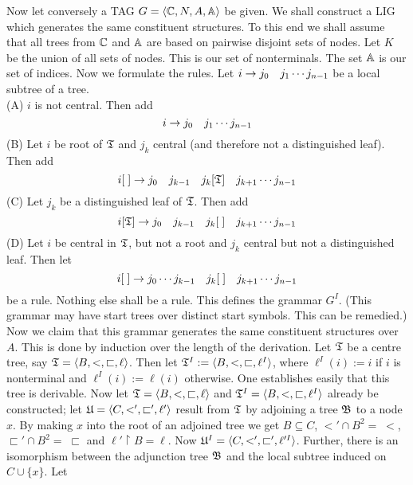 Now let conversely a TAG $G = \langle\mathbb{C}, N, A, \mathbb{A}\rangle$ be given. 
We shall construct a LIG which generates the same
constituent structures. To this end we shall assume that all
trees from $\mathbb{C}$ and $\mathbb{A}$ are based on pairwise disjoint
sets of nodes. Let $K$ be the union of all sets of nodes. This is
our set of nonterminals. The set $\mathbb{A}$ is our set of
indices. Now we formulate the rules.  Let $i \pf j_0 \quad j_1 %
\dotsb j_{n-1}$ be a local subtree of a tree. 
\\
(A) $i$ is not central. Then add
\begin{equation}
i \rightarrow j_0\quad j_1 \dotsb j_{n-1}
\end{equation}
(B) Let $i$ be root of $\mathfrak{T}$ and $j_k$ central
(and therefore not a distinguished leaf). Then add
\begin{equation}
i[\;] \rightarrow j_0 \quad j_{k-1}\quad  j_k[\mathfrak{T}] \quad j_{k+1}
\dotsb j_{n-1}
\end{equation}
(C) Let $j_k$ be a distinguished leaf of $\mathfrak{T}$.
Then add
\begin{equation}
i[\GT] \pf j_0 \quad j_{k-1}\quad j_k[\;]\quad j_{k+1}%
\dotsb j_{n-1}
\end{equation}
(D) Let $i$ be central in $\mathfrak{T}$, but not a root
and $j_k$ central but not a distinguished leaf.
Then let
\begin{equation}
i[\;] \rightarrow j_0 \dotsb j_{k-1} \quad j_k[\;] \quad j_{k+1}\dotsb
    j_{n-1}
\end{equation}
be a rule.  Nothing else shall be a rule. This defines the grammar
$G^I$. (This grammar may have start trees over distinct start
symbols. This can be remedied.)
Now we claim that this grammar generates the same constituent
structures over $A$. This is done by induction over the length
of the derivation. Let $\mathfrak{T}$ be a centre tree, say
$\mathfrak{T} = \langle B, <, \sqsubset, \ell\rangle$.  Then let
$\mathfrak{T}^I := \langle B, <, \sqsubset, \ell^I\rangle$, where
$\ell^I(i) := i$ if $i$ is nonterminal and $\ell^I(i) := \ell(i)$
otherwise. One establishes easily that this tree is derivable.
Now let $\mathfrak{T} = \langle B, <, \sqsubset, \ell\rangle$ and
$\mathfrak{T}^I = \langle B, <, \sqsubset, \ell^I\rangle$ already be
constructed; let $\mathfrak{U} = \langle C, <', \sqsubset', \ell'\rangle$
result from $\mathfrak{T}$ by adjoining a tree $\mathfrak{B}$ to a node
$x$. By making $x$ into the root of an adjoined tree
we get $B \subseteq C$, $<' \cap B^2 = \; <$, $\sqsubset' \cap B^2 =
\; \sqsubset$ and $\ell' \restriction B = \ell$. Now
$\mathfrak{U}^I = \langle C, <', \sqsubset', \ell'^I\rangle$.
Further, there is an isomorphism between the  adjunction tree
$\mathfrak{B}$ and the local subtree induced on $C \cup \{x\}$. Let
